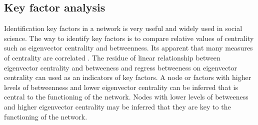\subsection*{Key factor analysis}

Identification key factors in a network is very useful and widely used in social science. The way to identify key factors is to compare relative values of centrality such as eigenvector centrality and betweenness. Its apparent that many measures of centrality are correlated \citet{Valente:2008wd}. The residue of linear relationship between eigenvector centrality and betweeness and regress betweeness on eigenvector centrality can used as an indicators of key factors. A node or factors with higher levels of betweenness and lower eigenvector centrality can be inferred that is central to the functioning of the network. Nodes with lower levels of betweeness and higher eigenvector centrality may be inferred that they are key to the functioning of the network.